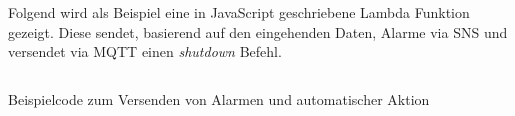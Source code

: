 \label{anhang:echtzeit-codesample}
Folgend wird als Beispiel eine in JavaScript geschriebene Lambda Funktion gezeigt. Diese sendet, basierend auf den eingehenden Daten, Alarme via \ac{SNS} und versendet via \ac{MQTT} einen \textit{shutdown} Befehl.
\begin{listing}[H]
\inputminted[frame=lines,breaklines=true]{javascript}{code/sample-realtime-lambda.js}
\caption{Beispielcode zum Versenden von Alarmen und automatischer Aktion}
\label{listing:sample-realtime-alarm-action}
\end{listing}